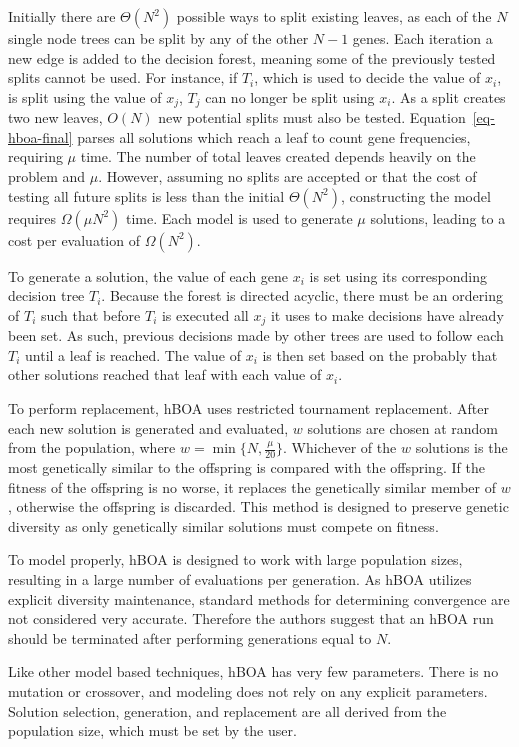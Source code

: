 \documentclass[twoside]{article}
\begin{document}
Initially there are $\Theta(N^2)$ possible ways to split existing leaves, as each of the $N$ single node
trees can be split by any of the other $N-1$ genes. Each iteration a new edge is added to the decision
forest, meaning some of the previously tested splits cannot be used. For instance, if $T_i$, which is used
to decide the value of $x_i$, is split using the value of $x_j$, $T_j$ can no longer be split using $x_i$.
As a split creates two new leaves, $O(N)$ new potential splits must also be tested. Equation~\ref{eq-hboa-final}
parses all solutions which reach a leaf to count gene frequencies, requiring $\mu$ time.
The number of total leaves created depends heavily on the problem and $\mu$.
However, assuming no splits are accepted or that the cost of testing all future splits is less than
the initial $\Theta(N^2)$, constructing the model requires $\Omega(\mu N^2)$ time. Each
model is used to generate $\mu$ solutions, leading to a cost per evaluation of $\Omega(N^2)$.

To generate a solution, the value of each gene $x_i$ is set using its corresponding decision tree $T_i$. Because
the forest is directed acyclic, there must be an ordering of $T_i$ such that before $T_i$ is executed all
$x_j$ it uses to make decisions have already been set. As such, previous decisions made by other trees
are used to follow each $T_i$ until a leaf is reached. The value of $x_i$ is then set based on the
probably that other solutions reached that leaf with each value of $x_i$.

To perform replacement, hBOA uses restricted tournament replacement. After each new solution is generated
and evaluated, $w$ solutions are chosen at random from the population, where $w=\min\{N, \frac{\mu}{20}\}$.
Whichever of the $w$ solutions is the most genetically similar to the offspring is compared with the offspring.
If the fitness of the offspring is no worse, it replaces the genetically similar member of $w$, otherwise the
offspring is discarded. This method is designed to preserve genetic diversity as only genetically similar
solutions must compete on fitness.

To model properly, hBOA is designed to work with large population sizes, resulting in a large number of
evaluations per generation. As hBOA utilizes explicit diversity maintenance, standard methods for determining
convergence are not considered very accurate. Therefore the authors suggest that an hBOA run should be
terminated after performing generations equal to $N$.

Like other model based techniques, hBOA has very few parameters. There is no mutation or crossover,
and modeling does not rely on any explicit parameters. Solution selection, generation, and replacement
are all derived from the population size, which must be set by the user.
\end{document}
